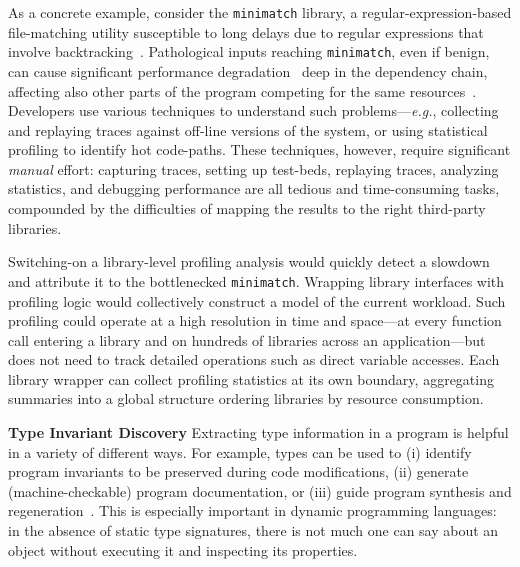 \documentclass[letterpaper,twocolumn,10pt]{article}
\def\eg{{\em e.g.}, }
\newcommand{\heading}[1]{\vspace{2pt}\noindent\textbf{#1}\enspace}
\newcommand{\ttt}[1]{\texttt{#1}}
\newcommand{\fixme}[1]{{\color{red}#1}}
\begin{document}
As a concrete example, consider the \ttt{minimatch} library, a regular-expression-based file-matching utility susceptible to long delays due to regular expressions that involve backtracking~\cite{minimatch}.
Pathological inputs reaching \ttt{minimatch}, even if benign, can cause significant performance degradation~\cite{redos} deep in the dependency chain, affecting also other parts of the program competing for the same resources~\cite{evp}.
Developers use various techniques to understand such problems---\eg collecting and replaying traces against off-line versions of the system, or using statistical profiling to identify hot code-paths.
These techniques, however, require significant \emph{manual} effort:
  capturing traces, setting up test-beds, replaying traces, analyzing statistics, and debugging performance are all tedious and time-consuming tasks, compounded by the difficulties of mapping the results to the right third-party libraries.

Switching-on a library-level profiling analysis %
  would quickly detect a slowdown and attribute it to the bottlenecked \ttt{minimatch}.
Wrapping library interfaces with profiling logic would collectively construct a model of the current workload.
Such profiling could operate at a high resolution in time and space---at every function call entering a library and on hundreds of libraries across an application---but does not need to track detailed operations such as direct variable accesses.
Each library wrapper can collect profiling statistics at its own boundary, aggregating summaries into a global structure ordering libraries by resource consumption.



\heading{Type Invariant Discovery}
Extracting type information in a program is helpful in a variety of different ways. %
For example, types can be used to (i) identify program invariants to be preserved during code modifications, (ii) generate (machine-checkable) program documentation, or (iii) guide program synthesis and regeneration~\cite{daikon}.
This is especially important in dynamic programming languages:
  in the absence of static type signatures, there is not much one can say about an object without executing it and inspecting its properties.
\end{document}
